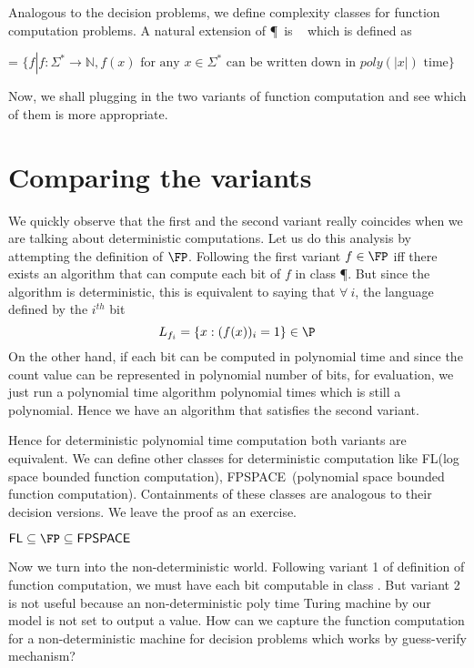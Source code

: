 \documentclass{report}
\newcommand{\FPSPACE}{{\sf FPSPACE~}}
\newcommand{\N}{{\mathbb{N}}}
\begin{document}
Analogous to the decision problems, we define complexity classes for function
computation problems. A natural extension of \P~is \FP~ which is defined as
\begin{center}
\FP = $\{f \left | \right . f:\Sigma^* \to \N, f(x) \text{ for any } x \in
\Sigma^* \text{ can be written down in } poly(|x|) \text{ time}\}$
\end{center}

Now, we shall plugging in the two variants of function computation and see
which of them is more appropriate.

\section{Comparing the variants}
We quickly observe that the first and the second variant really coincides when we are talking
about deterministic computations. Let us do this analysis by attempting the definition of $\FP$.
Following the first variant $f \in \FP$ iff there exists an algorithm that can
compute each bit of $f$ in class \P. But since the algorithm is deterministic, this is  
equivalent to saying that $\forall~i$, the language defined by the $i^{th}$ bit 
$$L_{f_i} = \{ x : (f(x))_i = 1 \} \in \P$$
On the other hand, if each bit can be computed in polynomial time 
and since the count value can be represented in polynomial number of bits, for
evaluation, we just run a polynomial time algorithm polynomial times
which is still a polynomial. Hence we have an algorithm that satisfies the 
second variant.

Hence for deterministic polynomial time computation both variants are equivalent.
We can define other classes for deterministic computation 
like {\sf FL}(log space bounded function computation), \FPSPACE(polynomial
space bounded function computation). Containments of these classes are
analogous to their decision versions. We leave the proof as an exercise.

\begin{lemma}
${\sf FL} \subseteq \FP \subseteq \FPSPACE$
\end{lemma}

Now we turn into the non-deterministic world. 
Following variant 1 of definition of function computation, we must have each
bit computable in class \NP. But variant 2 is not useful because an non-deterministic 
poly time Turing machine by our model is not set to output a value. How can we
capture the function computation for a non-deterministic machine for decision
problems which works by guess-verify mechanism?
\end{document}
